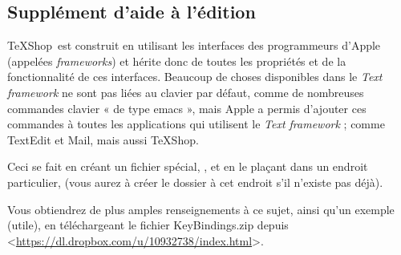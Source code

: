 \documentclass[11pt,french]{article}
\newcommand{\TS}{\textsf{\TeX Shop}}
\newcommand{\cmd}[1]{\textsf{#1}}
\begin{document}
\subsection{Supplément d'aide à l'édition}

\TS\ est construit en utilisant les interfaces des programmeurs d'Apple (appelées \emph{frameworks}) et hérite donc de toutes les propriétés et de la fonctionnalité de ces interfaces. Beaucoup de choses disponibles dans le \emph{Text framework} ne sont pas liées au clavier par défaut, comme de nombreuses commandes clavier « de type \cmd{emacs} », mais Apple a permis d'ajouter ces commandes à toutes les applications qui utilisent le \emph{Text framework} ; comme \textsf{TextEdit} et \textsf{Mail}, mais aussi \TS.

Ceci se fait en créant un fichier spécial, , et en le plaçant dans un endroit particulier,  (vous aurez à créer le dossier  à cet endroit s'il n'existe pas déjà).

Vous obtiendrez de plus amples renseignements à ce sujet, ainsi qu'un exemple (utile), en téléchargeant le fichier \textsf{KeyBindings.zip} depuis <\url{https://dl.dropbox.com/u/10932738/index.html}>.

%
%

\end{document}
